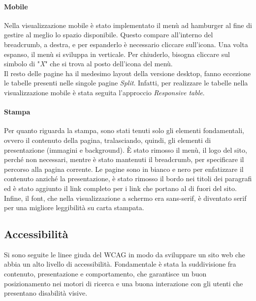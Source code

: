 \paragraph{Mobile}
Nella visualizzazione mobile è stato implementato il menù ad hamburger al fine di gestire al meglio lo spazio disponibile. Questo compare all'interno del breadcrumb, a destra, e per espanderlo è necessario cliccare sull'icona. Una volta espanso, il menù si sviluppa in verticale. Per chiuderlo, bisogna cliccare sul simbolo di "\textit{X}" che si trova al posto dell'icona del menù. \\
Il resto delle pagine ha il medesimo layout della versione desktop, fanno eccezione le tabelle presenti nelle singole pagine \textit{Split}. Infatti, per realizzare le tabelle nella visualizzazione mobile è stata seguita l'approccio \textit{Responsive table}. 
\paragraph{Stampa}
Per quanto riguarda la stampa, sono stati tenuti solo gli elementi fondamentali, ovvero il contenuto della pagina, tralasciando, quindi, gli elementi di presentazione (immagini e
background). È stato rimosso il menù, il logo del sito, perché non necessari, mentre è stato mantenuti il breadcrumb, per specificare il percorso alla pagina corrente. Le pagine sono in bianco e nero per
enfatizzare il contenuto anziché la presentazione, è stato rimosso il bordo nei titoli dei paragrafi ed è stato aggiunto il link completo per i link che portano al di fuori del sito. Infine, il font, che nella visualizzazione a schermo era sans-serif,  è diventato serif per una migliore leggibilità su carta stampata.

\subsection{Accessibilità}
Si sono seguite le linee giuda del WCAG in modo da sviluppare un sito web che abbia un alto livello di accessibilità. Fondamentale è stata la suddivisione fra contenuto, presentazione e comportamento, che garantisce un buon posizionamento nei motori di ricerca e una buona interazione con gli utenti che presentano disabilità visive.

